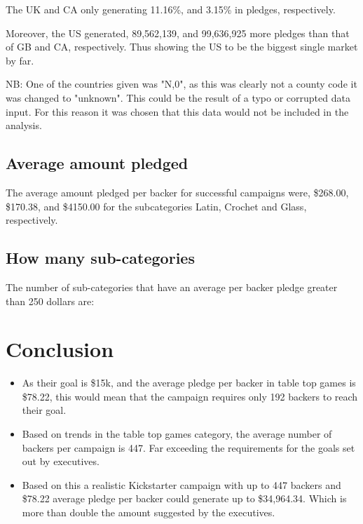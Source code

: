 \documentclass{article}
\begin{document}
\medskip
\noindent The UK and CA only generating 11.16\%, and 3.15\% in pledges, respectively.

\medskip
\noindent Moreover, the US generated, 89,562,139, and 99,636,925 more pledges than that of GB and CA, respectively. Thus showing the US to be the biggest single market by far. 



\medskip

\noindent NB: One of the countries given was "N,0", as this was clearly not a county code it was changed to "unknown". This could be the result of a typo or corrupted data input. For this reason it was chosen that this data would not be included in the analysis. 

\medskip
\subsection{Average amount pledged}
\noindent The average amount pledged per backer for successful campaigns were,  \$268.00, \$170.38, and \$4150.00 for the subcategories Latin, Crochet and Glass, respectively. 

\medskip
\subsection{How many sub-categories}

The number of sub-categories that have an average per backer pledge greater than 250 dollars are:



\section{Conclusion}


\begin{itemize}
\item As their goal is \$15k, and the average pledge per backer in table top games is \$78.22, this would mean that the campaign requires only 192  backers to reach their goal. 
\item Based on trends in the table top games category, the average number of backers per campaign is 447. Far exceeding the requirements for the goals set out by executives. 
\item Based on this a realistic Kickstarter campaign with up to 447 backers and \$78.22 average pledge per backer could generate up to \$34,964.34. Which is more than double the amount suggested by the executives. 
\end{itemize}
\end{document}
